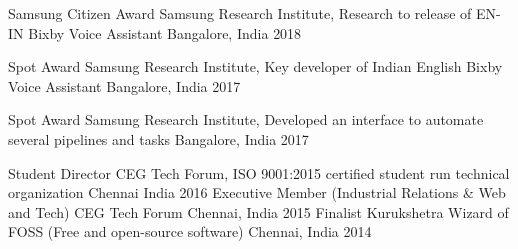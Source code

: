 



\begin{cvhonors}


  \cvhonor
    {Samsung Citizen Award} %
    {Samsung Research Institute, Research to release of EN-IN Bixby Voice Assistant} %
    {Bangalore, India} %
    {2018} %

  \cvhonor
    {Spot Award} %
    {Samsung Research Institute, Key developer of Indian English Bixby Voice Assistant} %
    {Bangalore, India} %
    {2017} %

  \cvhonor
    {Spot Award} %
    {Samsung Research Institute, Developed an interface to automate several pipelines and tasks} %
    {Bangalore, India} %
    {2017} %

  \cvhonor
    {Student Director} %
    {CEG Tech Forum, ISO 9001:2015 certified student run technical organization} %
    {Chennai India} %
    {2016} %
%
  \cvhonor
    {Executive Member (Industrial Relations \& Web and Tech)} %
    {CEG Tech Forum} %
    {Chennai, India} %
    {2015} %
%
  \cvhonor
  {Finalist} %
  {Kurukshetra Wizard of FOSS (Free and open-source software)} %
  {Chennai, India} %
  {2014} %
%

\end{cvhonors}


